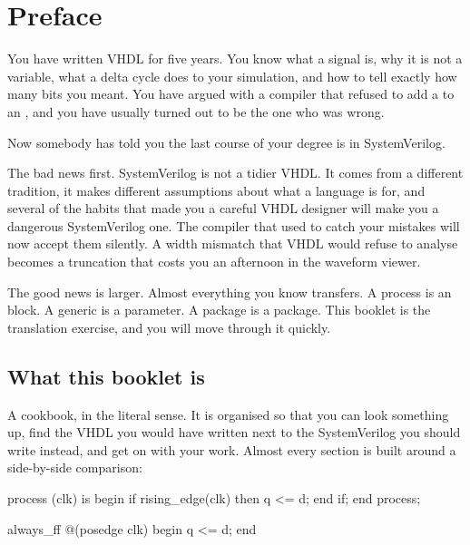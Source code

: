 \chapter*{Preface}

You have written VHDL for five years. You know what a signal is, why it is not
a variable, what a delta cycle does to your simulation, and how to tell
 exactly how many bits you meant. You have argued with a
compiler that refused to add a  to an , and you have
usually turned out to be the one who was wrong.

Now somebody has told you the last course of your degree is in SystemVerilog.

The bad news first. SystemVerilog is not a tidier VHDL. It comes from a
different tradition, it makes different assumptions about what a language is
for, and several of the habits that made you a careful VHDL designer will make
you a dangerous SystemVerilog one. The compiler that used to catch your
mistakes will now accept them silently. A width mismatch that VHDL would refuse
to analyse becomes a truncation that costs you an afternoon in the waveform
viewer.

The good news is larger. Almost everything you know transfers. A process is an
 block. A generic is a parameter. A package is a package. This
booklet is the translation exercise, and you will move through it quickly.

\section*{What this booklet is}

A cookbook, in the literal sense. It is organised so that you can look
something up, find the VHDL you would have written next to the SystemVerilog
you should write instead, and get on with your work. Almost every section is
built around a side-by-side comparison:

\begin{rosetta}
\begin{rleft}
process (clk) is
begin
  if rising_edge(clk) then
    q <= d;
  end if;
end process;
\end{rleft}
\begin{rright}
always_ff @(posedge clk) begin
  q <= d;
end
\end{rright}
\end{rosetta}


